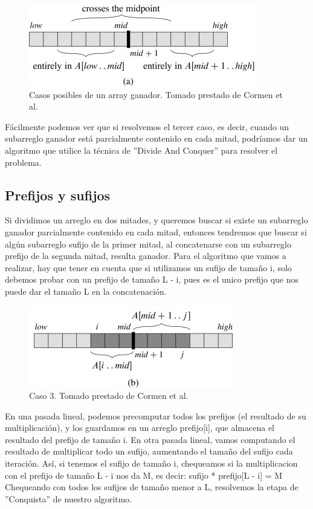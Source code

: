 \begin{figure}
  \centering
    \includegraphics[scale=3]{img/subarrays-casos.jpg}
  \caption {Casos posibles de un array ganador. Tomado prestado de Cormen et al.\cite{cormen_algo}}
\end{figure}

Fácilmente podemos ver que si resolvemos el tercer caso, es decir, cuando un subarreglo
ganador está parcialmente contenido en cada mitad, podríamos dar un algoritmo
que utilice la técnica de ''Divide And Conquer'' para resolver el problema.

\subsection{Prefijos y sufijos}
Si dividimos un arreglo en dos mitades, y queremos buscar si existe un subarreglo ganador
parcialmente contenido en cada mitad, entonces tendremos que buscar si algún subarreglo
sufijo de la primer mitad, al concatenarse con un subarreglo prefijo de la segunda mitad,
resulta ganador.
Para el algoritmo que vamos a realizar, hay que tener en cuenta que si utilizamos un
sufijo de tamaño i, solo debemos probar con un prefijo de tamaño L - i, pues es el unico prefijo
que nos puede dar el tamaño L en la concatenación.



\begin{figure}
  \centering
    \includegraphics[scale=3]{img/subarrays-crossmid.jpg}
  \caption {Caso 3. Tomado prestado de Cormen et al.\cite{cormen_algo}}
\end{figure}

En una pasada lineal, podemos precomputar todos los prefijos (el resultado de su multiplicación),
y los guardamos en un arreglo prefijo[i], que almacena el resultado del prefijo de tamaño i.
\newline
En otra pasada lineal, vamos computando el resultado de multiplicar todo un sufijo, aumentando
el tamaño del sufijo cada iteración. Así, si tenemos el sufijo de tamaño i, chequeamos si
la multiplicacion con el prefijo de tamaño L - i nos da M, es decir:
\newline
\newline
sufijo * prefijo[L - i] = M
\newline
\newline
Chequeando con todos los sufijos de tamaño menor a L, resolvemos la etapa de ''Conquista'' de nuestro
algoritmo.


